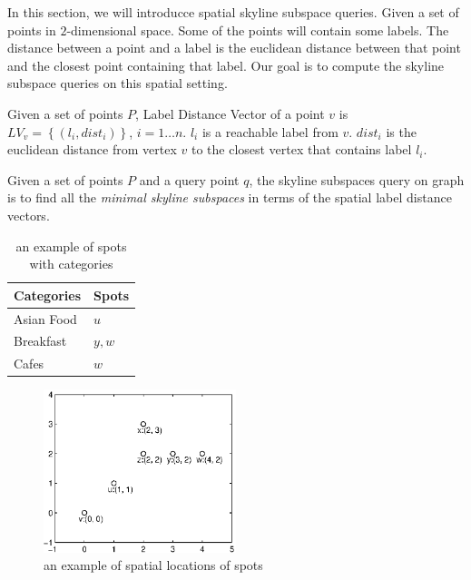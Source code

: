 In this section, we will introducce spatial skyline subspace queries. Given a set of points in $2$-dimensional space. Some of the points will contain some labels. The distance between a point and a label is the euclidean distance between that point and the closest point containing that label. Our goal is to compute the skyline subspace queries on this spatial setting.

\begin{definition}
Given a set of points $P$, Label Distance Vector of a point $v$ is $LV_v=\left\{\left(l_i, dist_i\right)\right\}$, $i = 1 \ldots n$. $l_i$ is a reachable label from $v$. $dist_i$ is the euclidean distance from vertex $v$ to the closest vertex that contains label $l_i$.
\end{definition}

\begin{definition}
Given a set of points $P$ and a query point $q$, the skyline subspaces query on graph is to find all the \emph{minimal skyline subspaces} in terms of the spatial label distance vectors.
\end{definition}

\begin{table}[h]
    \centering
    \begin{tabular}{|l|l|}
    \hline
    Categories     & Spots \\ \hline
    Asian Food     & $u$     \\ \hline
    Breakfast      & $y, w$  \\ \hline
    Cafes          & $w$     \\ \hline
    \end{tabular}
    \caption{\label{tab:spot_category} an example of spots with categories}
    
\end{table}


\begin{figure}[h]
    \centering
    \includegraphics[width=0.5\textwidth]{figs/spatial_figure}
    \caption{\label{fig:spatial_map}an example of spatial locations of spots}
    
\end{figure}

